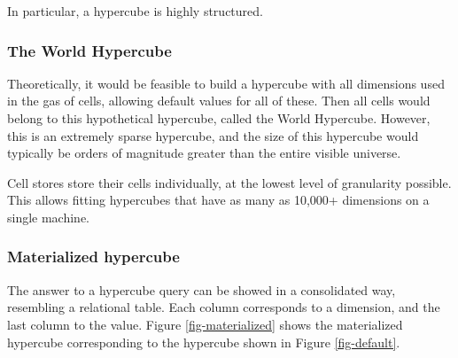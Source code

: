 \documentclass{acm_proc_article-sp}
\begin{document}
In particular, a hypercube is highly structured.

\subsubsection{The World Hypercube}
Theoretically, it would be feasible to build a hypercube with all dimensions used in the gas of cells, allowing default values for all of these. Then all cells would belong to this hypothetical hypercube, called the World Hypercube. However, this is an extremely sparse hypercube, and the size of this hypercube would typically be orders of magnitude greater than the entire visible universe.

Cell stores store their cells individually, at the lowest level of granularity possible. This allows fitting hypercubes that have as many as 10,000+ dimensions on a single machine.

\subsubsection{Materialized hypercube}

The answer to a hypercube query can be showed in a consolidated way, resembling a relational table. Each column corresponds to a dimension, and the last column to the value. Figure \ref{fig-materialized} shows the materialized hypercube corresponding to the hypercube shown in Figure \ref{fig-default}.
\end{document}
